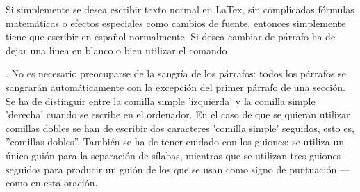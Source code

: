 \documentclass[a4paper,10pt]{letter}
\begin{document}
Si simplemente se desea escribir texto normal en LaTex,
sin complicadas fórmulas matemáticas o efectos especiales
como cambios de fuente, entonces simplemente tiene que escribir
en español normalmente.
Si desea cambiar de párrafo ha de dejar una línea en blanco o bien
utilizar el comando \par.
No es necesario preocuparse de la sangría de los párrafos:
todos los párrafos se sangrarán automáticamente con la excepción
del primer párrafo de una sección.
Se ha de distinguir entre la comilla simple 'izquierda'
y la comilla simple 'derecha' cuando se escribe en el ordenador.
En el caso de que se quieran utilizar comillas dobles se han de
escribir dos caracteres 'comilla simple' seguidos, esto es,
''comillas dobles''.
También se ha de tener cuidado con los guiones: se utiliza un único
guión para la separación de sílabas, mientras que se utilizan
tres guiones seguidos para producir un guión de los que se usan
como signo de puntuación --- como en esta oración.
\end{document}
